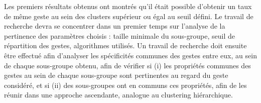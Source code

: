 Les premiers résultats obtenus ont montrés qu'il était possible d'obtenir un taux de même geste au sein des clusters supérieur ou égal au seuil défini. Le travail de recherche devra se concentrer dans un premier temps sur l'analyse de la pertinence des paramètres choisis : taille minimale du sous-groupe, seuil de répartition des gestes, algorithmes utilisés. Un travail de recherche doit ensuite être effectué afin d'analyser les spécificités communes des gestes entre eux, au sein de chaque sous-groupe obtenu, afin de vérifier si (i) les propriétés communes des gestes au sein de chaque sous-groupe sont pertinentes au regard du geste considéré, et si (ii) des sous-groupes ont en communs ces propriétés, afin de les réunir dans une approche ascendante, analogue au clustering hiérarchique.
